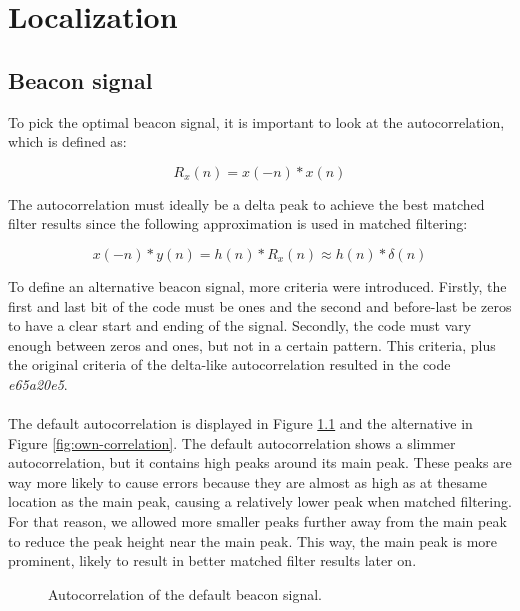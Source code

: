 \documentclass[final]{scrreprt} %
\begin{document}
\chapter{Localization}
\section{Beacon signal}
To pick the optimal beacon signal, it is important to look at the autocorrelation, which is defined as:

\begin{equation}
	R_x(n) = x(-n) * x(n)
\end{equation}

The autocorrelation must ideally be a delta peak to achieve the best matched filter results since the following approximation is used in matched filtering:

\begin{equation}
	x(-n) * y(n) = h(n) * R_x(n) \approx h(n) * \delta (n)
\end{equation}

To define an alternative beacon signal, more criteria were introduced.
Firstly, the first and last bit of the code must be ones and the second and before-last be zeros to have a clear start and ending of the signal.
Secondly, the code must vary enough between zeros and ones, but not in a certain pattern.
This criteria, plus the original criteria of the delta-like autocorrelation resulted in the code \emph{e65a20e5}.
\\ \\
The default autocorrelation is displayed in Figure \ref{fig:default-correlation} and the alternative in Figure \ref{fig:own-correlation}.
The default autocorrelation shows a slimmer autocorrelation, but it contains high peaks around its main peak.
These peaks are way more likely to cause errors because they are almost as high as at thesame location as the main peak, causing a relatively lower peak when matched filtering.
For that reason, we allowed more smaller peaks further away from the main peak to reduce the peak height near the main peak.
This way, the main peak is more prominent, likely to result in better matched filter results later on.

\begin{figure}[H]
	\centering
	\setlength\figureheight{4cm}
    	\setlength{}
	
	\caption{Autocorrelation of the default beacon signal.}
	\label{fig:default-correlation}
\end{figure}
\end{document}
